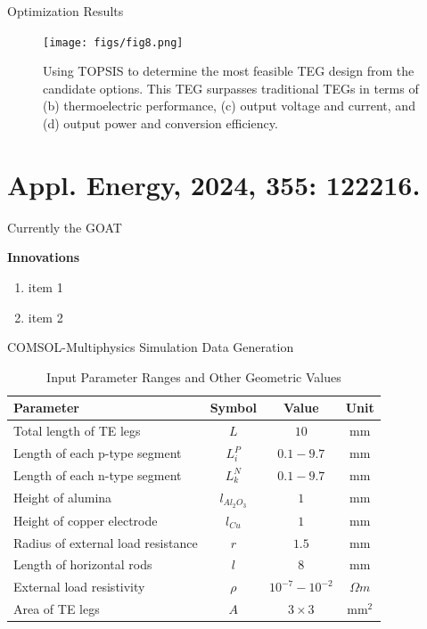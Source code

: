 \documentclass{beamer}
\begin{document}
\begin{frame}{Optimization Results}
    \small
    \begin{figure}
		\centering
		\texttt{[image: figs/fig8.png]}
		\caption{Using TOPSIS to determine the most feasible TEG design from the candidate options. This TEG surpasses traditional TEGs in terms of (b) thermoelectric performance, (c) output voltage and current, and (d) output power and conversion efficiency.}
		\label{fig8}
	\end{figure}
\end{frame}


\section{Appl. Energy, 2024, 355: 122216.}

\begin{frame}{Currently the GOAT}
    \small
    \begin{block}{\textbf{Innovations}}
        \begin{enumerate}
            \item item 1
            \item item 2
        \end{enumerate}   
    \end{block}
\end{frame}


\begin{frame}{COMSOL-Multiphysics Simulation Data Generation}
    \begin{table}[htbp]
    \caption{Input Parameter Ranges and Other Geometric Values}
    \centering
    \begin{tabular}{@{}lccc@{}}
    \toprule
    Parameter & Symbol & Value & Unit \\ \midrule
    Total length of TE legs & $L$ & $10$ & mm \\
    Length of each p-type segment & $L_i^P$ & $0.1 - 9.7$ & mm \\
    Length of each n-type segment & $L_k^N$ & $0.1 - 9.7$ & mm \\
    Height of alumina & $l_{Al_2O_3}$ & $1$ & mm \\
    Height of copper electrode & $l_{Cu}$ & $1$ & mm \\
    Radius of external load resistance & $r$ & $1.5$ & mm \\
    Length of horizontal rods & $l$ & $8$ & mm \\
    External load resistivity & $\rho$  & $10^{-7} - 10^{-2}$ & $\Omega m$ \\
    Area of TE legs & $A$ & $3 \times 3$ & mm$^2$ \\ \bottomrule
    \end{tabular}
    \end{table}
\end{frame}
\end{document}

